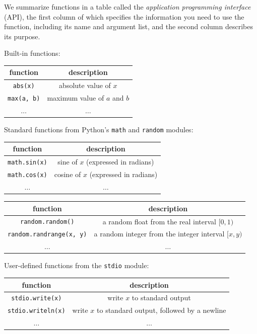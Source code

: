 \documentclass[8pt,a4paper,compress,handout]{beamer}
\begin{document}
\begin{frame}[fragile]
We summarize functions in a table called the \emph{application programming interface} (API), the first column of which specifies the information you need to use the function, including its name and argument list, and the second column describes its purpose.

\smallskip

Built-in functions:

\begin{center}
\begin{tabular}{cc}
function & description \\ \hline
\lstinline$abs(x)$ & absolute value of $x$ \\
\lstinline$max(a, b)$ & maximum value of $a$ and $b$ \\
$\dots$ & $\dots$
\end{tabular} 
\end{center}

\smallskip

Standard functions from Python's \lstinline{math} and \lstinline{random} modules:

\begin{center}
\begin{tabular}{cc}
function & description \\ \hline
\lstinline$math.sin(x)$ & sine of $x$ (expressed in radians) \\
\lstinline$math.cos(x)$ & cosine of $x$ (expressed in radians) \\
$\dots$ & $\dots$
\end{tabular} 

\begin{tabular}{cc}
function & description \\ \hline
\lstinline$random.random()$ & a random float from the real interval $[0, 1)$ \\
\lstinline$random.randrange(x, y)$ & a random integer from the integer interval $[x, y)$ \\
$\dots$ & $\dots$
\end{tabular} 
\end{center}

\smallskip

User-defined functions from the \lstinline{stdio} module:

\begin{center}
\begin{tabular}{cc}
function & description \\ \hline
\lstinline$stdio.write(x)$ & write $x$ to standard output \\
\lstinline$stdio.writeln(x)$ & write $x$ to standard output, followed by a newline \\
$\dots$ & $\dots$
\end{tabular} 
\end{center}
\end{frame}
\end{document}
